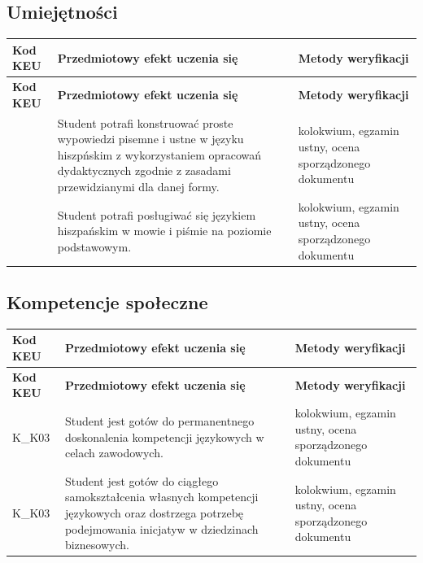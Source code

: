 \documentclass[12pt, a4paper]{article}
\newcommand{\thdrule}{\noalign{\global\setlength{\extrarowheight}{0pt}}}
\newcommand{\thdend}{\noalign{\global\setlength{\extrarowheight}{3pt}}}
\begin{document}
\subsection*{Umiejętności}
{\scriptsize
\begin{longtable}{m{1.6cm}m{9.0cm}m{4.2cm}}
\thdrule\toprule
\rowcolor{pjatkRed} {\color{white}\footnotesize\textbf{\vphantom{Ag}Kod KEU}} & {\color{white}\footnotesize\textbf{\vphantom{Ag}Przedmiotowy efekt uczenia się}} & {\color{white}\footnotesize\textbf{\vphantom{Ag}Metody weryfikacji}} \\
\midrule\thdend
\endfirsthead
\thdrule\toprule
\rowcolor{pjatkRed} {\color{white}\footnotesize\textbf{\vphantom{Ag}Kod KEU}} & {\color{white}\footnotesize\textbf{\vphantom{Ag}Przedmiotowy efekt uczenia się}} & {\color{white}\footnotesize\textbf{\vphantom{Ag}Metody weryfikacji}} \\
\midrule\thdend
\endhead
  \rowcolor{tableRowLight}  & Student potrafi konstruować proste wypowiedzi pisemne i ustne w języku hiszpńskim z wykorzystaniem opracowań dydaktycznych zgodnie z zasadami przewidzianymi dla danej formy. & kolokwium, egzamin ustny, ocena sporządzonego dokumentu \\
  \rowcolor{tableRowAlt}  & Student potrafi posługiwać się językiem hiszpańskim w mowie i piśmie na poziomie podstawowym. & kolokwium, egzamin ustny, ocena sporządzonego dokumentu \\
\bottomrule
\end{longtable}}

\subsection*{Kompetencje społeczne}
{\scriptsize
\begin{longtable}{m{1.6cm}m{9.0cm}m{4.2cm}}
\thdrule\toprule
\rowcolor{pjatkRed} {\color{white}\footnotesize\textbf{\vphantom{Ag}Kod KEU}} & {\color{white}\footnotesize\textbf{\vphantom{Ag}Przedmiotowy efekt uczenia się}} & {\color{white}\footnotesize\textbf{\vphantom{Ag}Metody weryfikacji}} \\
\midrule\thdend
\endfirsthead
\thdrule\toprule
\rowcolor{pjatkRed} {\color{white}\footnotesize\textbf{\vphantom{Ag}Kod KEU}} & {\color{white}\footnotesize\textbf{\vphantom{Ag}Przedmiotowy efekt uczenia się}} & {\color{white}\footnotesize\textbf{\vphantom{Ag}Metody weryfikacji}} \\
\midrule\thdend
\endhead
  \rowcolor{tableRowLight} K\_K03 & Student jest gotów do permanentnego doskonalenia kompetencji językowych w celach zawodowych. & kolokwium, egzamin ustny, ocena sporządzonego dokumentu \\
  \rowcolor{tableRowAlt} K\_K03 & Student jest gotów do ciągłego samokształcenia własnych kompetencji językowych oraz dostrzega potrzebę podejmowania inicjatyw w dziedzinach biznesowych. & kolokwium, egzamin ustny, ocena sporządzonego dokumentu \\
\bottomrule
\end{longtable}}
\end{document}
